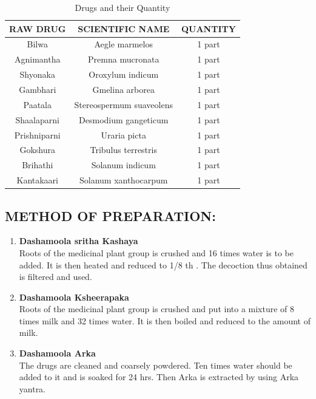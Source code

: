 \documentclass[11pt]{article} %
\begin{document}
\begin{table}[h]
	\centering
	\caption{Drugs and their Quantity}
	\label{tab:Raw Drug}
	\begin{tabular}{|c|c|c|}
		\hline
		RAW DRUG                            & SCIENTIFIC NAME          & QUANTITY         \\ \hline
		Bilwa                               & Aegle marmelos           & 1 part   \\ \hline
		Agnimantha                          & Premna mucronata         & 1 part   \\ \hline
		Shyonaka                            & Oroxylum indicum         & 1 part   \\ \hline
		Gambhari                            & Gmelina arborea          & 1 part   \\ \hline
		Paatala                             & Stereospermum suaveolens & 1 part   \\ \hline
		Shaalaparni                         & Desmodium gangeticum     & 1 part   \\ \hline
		Prishniparni                        & Uraria picta             & 1 part   \\ \hline
		Gokshura                            & Tribulus terrestris      & 1 part   \\ \hline
		Brihathi                            & Solanum indicum          & 1 part   \\ \hline
		Kantakaari                          & Solanum xanthocarpum     & 1 part   \\ \hline
	\end{tabular}
\end{table}


\subsection*{METHOD OF PREPARATION:}

\begin{enumerate}
	\item \textbf{Dashamoola sritha Kashaya}\\
	Roots of the medicinal plant group is crushed and 16 times water is to be added. It is then heated and reduced to 1/8 th . The decoction thus obtained is filtered and used.
	\item \textbf{Dashamoola Ksheerapaka}\\
	Roots of the medicinal plant group is crushed and put into a mixture of 8 times milk and 32 times water. It is then boiled and reduced to the amount of milk.
	\item \textbf{Dashamoola Arka}\\
	The drugs are cleaned and coarsely powdered. Ten times water should be added to it and is
	soaked for 24 hrs. Then Arka is extracted by using Arka yantra.
\end{enumerate}
\end{document}
